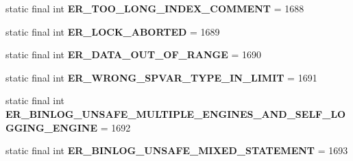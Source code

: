 \begin{DoxyCompactItemize}
\item 
\mbox{\label{classcom_1_1mysql_1_1cj_1_1exceptions_1_1_mysql_error_numbers_a1567b156651eb8d5071d83d9f175fe20}} 
static final int {\bfseries E\+R\+\_\+\+T\+O\+O\+\_\+\+L\+O\+N\+G\+\_\+\+I\+N\+D\+E\+X\+\_\+\+C\+O\+M\+M\+E\+NT} = 1688
\item 
\mbox{\label{classcom_1_1mysql_1_1cj_1_1exceptions_1_1_mysql_error_numbers_accd06ab5ae97851cc86722971dfb9d38}} 
static final int {\bfseries E\+R\+\_\+\+L\+O\+C\+K\+\_\+\+A\+B\+O\+R\+T\+ED} = 1689
\item 
\mbox{\label{classcom_1_1mysql_1_1cj_1_1exceptions_1_1_mysql_error_numbers_a77f2c2def620b51f602374107861fe57}} 
static final int {\bfseries E\+R\+\_\+\+D\+A\+T\+A\+\_\+\+O\+U\+T\+\_\+\+O\+F\+\_\+\+R\+A\+N\+GE} = 1690
\item 
\mbox{\label{classcom_1_1mysql_1_1cj_1_1exceptions_1_1_mysql_error_numbers_a80fa31ab55eb9446c52d34d2f3e8c21e}} 
static final int {\bfseries E\+R\+\_\+\+W\+R\+O\+N\+G\+\_\+\+S\+P\+V\+A\+R\+\_\+\+T\+Y\+P\+E\+\_\+\+I\+N\+\_\+\+L\+I\+M\+IT} = 1691
\item 
\mbox{\label{classcom_1_1mysql_1_1cj_1_1exceptions_1_1_mysql_error_numbers_a8f36dd117f7123788fef0ca6e2599cf0}} 
static final int {\bfseries E\+R\+\_\+\+B\+I\+N\+L\+O\+G\+\_\+\+U\+N\+S\+A\+F\+E\+\_\+\+M\+U\+L\+T\+I\+P\+L\+E\+\_\+\+E\+N\+G\+I\+N\+E\+S\+\_\+\+A\+N\+D\+\_\+\+S\+E\+L\+F\+\_\+\+L\+O\+G\+G\+I\+N\+G\+\_\+\+E\+N\+G\+I\+NE} = 1692
\item 
\mbox{\label{classcom_1_1mysql_1_1cj_1_1exceptions_1_1_mysql_error_numbers_aa849a3b4b0608409c79538e2d85abca5}} 
static final int {\bfseries E\+R\+\_\+\+B\+I\+N\+L\+O\+G\+\_\+\+U\+N\+S\+A\+F\+E\+\_\+\+M\+I\+X\+E\+D\+\_\+\+S\+T\+A\+T\+E\+M\+E\+NT} = 1693
\item 
\mbox{\label{classcom_1_1mysql_1_1cj_1_1exceptions_1_1_mysql_error_numbers_a9a875e39ca85368d0da5ae66a2706606}} 

\end{DoxyCompactItemize}
